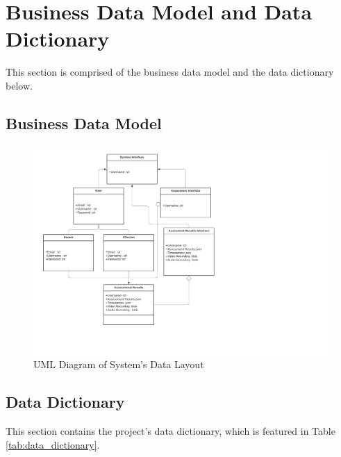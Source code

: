 \documentclass[12pt]{article}
\begin{document}
\newpage

\section{Business Data Model and Data Dictionary}
\hspace{2em}This section is comprised of the business data model and the data dictionary below.
\subsection{Business Data Model}
\begin{figure}[H]
  \centering
  \includegraphics[scale=0.35]{images/UML class.png}
  \caption{UML Diagram of System's Data Layout}
\end{figure}

\newpage

\subsection{Data Dictionary}
\hspace{2em} This section contains the project's data dictionary, which is featured in Table \ref{tab:data_dictionary}.
\end{document}

